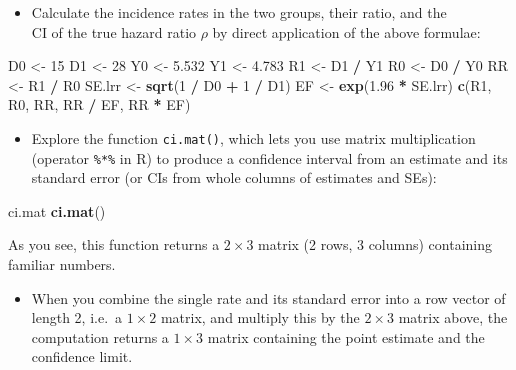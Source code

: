 \documentclass[
]{book}
\newenvironment{Shaded}{\begin{snugshade}}{\end{snugshade}}
\newcommand{\DecValTok}[1]{\textcolor[rgb]{0.00,0.00,0.81}{#1}}
\newcommand{\FloatTok}[1]{\textcolor[rgb]{0.00,0.00,0.81}{#1}}
\newcommand{\FunctionTok}[1]{\textcolor[rgb]{0.13,0.29,0.53}{\textbf{#1}}}
\newcommand{\NormalTok}[1]{#1}
\newcommand{\OtherTok}[1]{\textcolor[rgb]{0.56,0.35,0.01}{#1}}
\newcommand{\SpecialCharTok}[1]{\textcolor[rgb]{0.81,0.36,0.00}{\textbf{#1}}}
\providecommand{\tightlist}{%
  \setlength{\itemsep}{0pt}\setlength{\parskip}{0pt}}
\begin{document}
\begin{itemize}
\tightlist
\item
  Calculate the incidence rates in the two groups, their ratio, and the\\
  CI of the true hazard ratio \(\rho\) by direct application of the above formulae:
\end{itemize}

\begin{Shaded}
\begin{Highlighting}[]
\NormalTok{D0 }\OtherTok{\textless{}{-}} \DecValTok{15}
\NormalTok{D1 }\OtherTok{\textless{}{-}} \DecValTok{28}
\NormalTok{Y0 }\OtherTok{\textless{}{-}} \FloatTok{5.532}
\NormalTok{Y1 }\OtherTok{\textless{}{-}} \FloatTok{4.783}
\NormalTok{R1 }\OtherTok{\textless{}{-}}\NormalTok{ D1 }\SpecialCharTok{/}\NormalTok{ Y1}
\NormalTok{R0 }\OtherTok{\textless{}{-}}\NormalTok{ D0 }\SpecialCharTok{/}\NormalTok{ Y0}
\NormalTok{RR }\OtherTok{\textless{}{-}}\NormalTok{ R1 }\SpecialCharTok{/}\NormalTok{ R0}
\NormalTok{SE.lrr }\OtherTok{\textless{}{-}} \FunctionTok{sqrt}\NormalTok{(}\DecValTok{1} \SpecialCharTok{/}\NormalTok{ D0 }\SpecialCharTok{+} \DecValTok{1} \SpecialCharTok{/}\NormalTok{ D1)}
\NormalTok{EF }\OtherTok{\textless{}{-}} \FunctionTok{exp}\NormalTok{(}\FloatTok{1.96} \SpecialCharTok{*}\NormalTok{ SE.lrr)}
\FunctionTok{c}\NormalTok{(R1, R0, RR, RR }\SpecialCharTok{/}\NormalTok{ EF, RR }\SpecialCharTok{*}\NormalTok{ EF)}
\end{Highlighting}
\end{Shaded}

\begin{itemize}
\tightlist
\item
  Explore the function \texttt{ci.mat()}, which lets you use
  matrix multiplication (operator \texttt{\textquotesingle{}\%*\%\textquotesingle{}}
  in R) to produce a confidence interval from an estimate and its
  standard error (or CIs from whole columns of estimates and SEs):
\end{itemize}

\begin{Shaded}
\begin{Highlighting}[]
\NormalTok{ci.mat}
\FunctionTok{ci.mat}\NormalTok{()}
\end{Highlighting}
\end{Shaded}

As you see, this function returns a \(2\times 3\) matrix (2 rows, 3 columns) containing familiar numbers.

\begin{itemize}
\tightlist
\item
  When you combine the single rate and its standard error into
  a row vector of length 2, i.e.~a \(1\times 2\) matrix, and multiply this
  by the \(2\times 3\) matrix above, the computation returns
  a \(1\times 3\) matrix containing the point estimate and the
  confidence limit.
\end{itemize}
\end{document}
